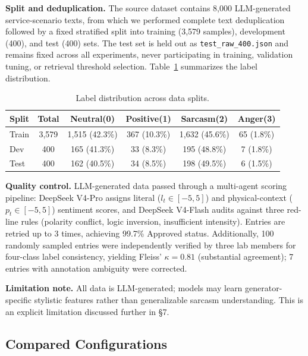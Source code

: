 \documentclass[conference]{IEEEtran}
\begin{document}
\textbf{Split and deduplication.}
The source dataset contains 8,000 LLM-generated service-scenario texts, from
which we performed complete text deduplication followed by a fixed stratified
split into training (3,579 samples), development (400), and test (400) sets.
The test set is held out as \texttt{test\_raw\_400.json} and remains fixed across
all experiments, never participating in training, validation tuning, or retrieval
threshold selection. Table~\ref{tab:data} summarizes the label distribution.

\begin{table}[H]
\centering
\caption{Label distribution across data splits.}
\label{tab:data}
\begin{tabular}{lccccc}
\toprule
\textbf{Split} & \textbf{Total} & \textbf{Neutral(0)} & \textbf{Positive(1)} & \textbf{Sarcasm(2)} & \textbf{Anger(3)} \\
\midrule
Train & 3,579 & 1,515 (42.3\%) & 367 (10.3\%) & 1,632 (45.6\%) & 65 (1.8\%) \\
Dev   & 400   & 165 (41.3\%)   & 33 (8.3\%)     & 195 (48.8\%)    & 7 (1.8\%) \\
Test  & 400   & 162 (40.5\%)   & 34 (8.5\%)     & 198 (49.5\%)    & 6 (1.5\%) \\
\bottomrule
\end{tabular}
\end{table}

\textbf{Quality control.}
LLM-generated data passed through a multi-agent scoring pipeline: DeepSeek V4-Pro
assigns literal ($l_t \in [-5,5]$) and physical-context ($p_t \in [-5,5]$)
sentiment scores, and DeepSeek V4-Flash audits against three red-line rules
(polarity conflict, logic inversion, insufficient intensity). Entries are retried
up to 3 times, achieving 99.7\% Approved status. Additionally, 100 randomly
sampled entries were independently verified by three lab members for four-class
label consistency, yielding Fleiss' $\kappa = 0.81$ (substantial agreement);
7 entries with annotation ambiguity were corrected.

\textbf{Limitation note.}
All data is LLM-generated; models may learn generator-specific stylistic features
rather than generalizable sarcasm understanding. This is an explicit limitation
discussed further in \S 7.

\subsection{Compared Configurations}
\end{document}
